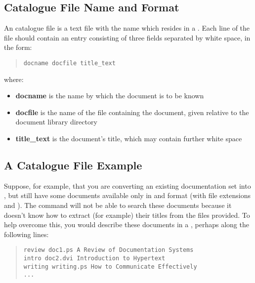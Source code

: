 \subsection{\label{sect:cataloguefileformat}Catalogue File Name and Format}

An  catalogue file is a text file with the name
 which resides in a . Each line of the file should contain
an entry consisting of three fields separated by white space, in the
form:

\begin{quote}
\begin{verbatim}
docname docfile title_text
\end{verbatim}
\end{quote}

where:

\begin{itemize}
\item {\bf docname} is the name by which the document is to be known
\item {\bf docfile} is the name of the file containing the document, given
relative to the document library directory
\item {\bf title\_text} is the document's title, which may contain
further white space
\end{itemize}

\subsection{A Catalogue File Example}

Suppose, for example, that you are converting an existing
documentation set into , but still have some documents
available only in  and 
format (with file extensions  and ). The
 command will not be able to search these
 documents because it doesn't know how to extract (for
example) their titles from the files provided. To help overcome this,
you would describe these documents in a , perhaps along the following lines:

\begin{quote}
\begin{verbatim}
review doc1.ps A Review of Documentation Systems
intro doc2.dvi Introduction to Hypertext
writing writing.ps How to Communicate Effectively
...
\end{verbatim}
\end{quote}


